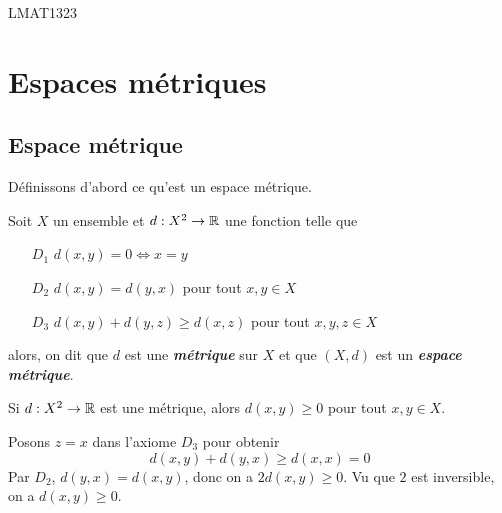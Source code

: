\documentclass[french]{article}
\begin{document}
\begin{titlepage}
  \maketitle
  \thispagestyle{empty}
  \centering
  \vfill
  LMAT1323
  \vfill
\end{titlepage}
\restoregeometry

\tableofcontents
\thispagestyle{empty}

\newpage

\section{Espaces métriques}

\subsection{Espace métrique}
Définissons d'abord ce qu'est un espace métrique.
\begin{definition}
  Soit $X$ un ensemble et $d: X^2 \rightarrow \mathbb{R}$ une fonction telle que
  \begin{itemize}
    \item[$D_1$] $d(x, y) = 0 \iff x = y$
    \item[$D_2$] $d(x, y) = d(y, x)$ pour tout $x, y \in X$
    \item[$D_3$] $d(x, y) + d(y, z) \geq d(x, z)$ pour tout $x, y, z \in X$  
  \end{itemize}
  alors, on dit que $d$ est une \textbf{\it métrique} sur $X$ et que $(X, d)$ est un \textbf{\it espace métrique}.
\end{definition}

\begin{lemme}
  Si $d: X^2 \rightarrow \mathbb{R}$ est une métrique, alors $d(x, y) \geq 0$ pour tout $x, y \in X$.

  \tcblower
  \begin{preuve}
    Posons $z = x$ dans l'axiome $D_3$ pour obtenir 
    $$d(x, y) + d(y, x) \geq d(x, x) = 0$$ 
    Par $D_2$, $d(y, x) = d(x, y)$, donc on a $2d(x, y) \geq 0$. Vu que $2$ est inversible, on a $d(x, y) \geq 0$.
  \end{preuve}
\end{lemme}
\end{document}
